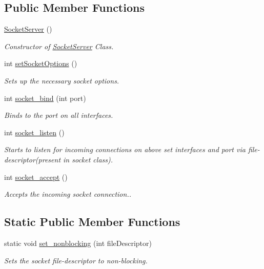 \subsection*{Public Member Functions}
\begin{DoxyCompactItemize}
\item 
\hyperlink{classSocketServer_a262ba93dc8ad71b260fb75124b3453ee}{Socket\+Server} ()\hypertarget{classSocketServer_a262ba93dc8ad71b260fb75124b3453ee}{}\label{classSocketServer_a262ba93dc8ad71b260fb75124b3453ee}

\begin{DoxyCompactList}\small\item\em Constructor of \hyperlink{classSocketServer}{Socket\+Server} Class. \end{DoxyCompactList}\item 
int \hyperlink{classSocketServer_a50b619d415d32f52771b663b3036940c}{set\+Socket\+Options} ()
\begin{DoxyCompactList}\small\item\em Sets up the necessary socket options. \end{DoxyCompactList}\item 
int \hyperlink{classSocketServer_aaa25d38578f271ab252bf9f5ecafd2e4}{socket\+\_\+bind} (int port)
\begin{DoxyCompactList}\small\item\em Binds to the port on all interfaces. \end{DoxyCompactList}\item 
int \hyperlink{classSocketServer_af49cec86f9f7c45fbeca8b94c37ec0a1}{socket\+\_\+listen} ()
\begin{DoxyCompactList}\small\item\em Starts to listen for incoming connections on above set interfaces and port via file-\/descriptor(present in socket class). \end{DoxyCompactList}\item 
int \hyperlink{classSocketServer_add005b4dc2e06b847566952e52029585}{socket\+\_\+accept} ()
\begin{DoxyCompactList}\small\item\em Accepts the incoming socket connection.. \end{DoxyCompactList}\end{DoxyCompactItemize}
\subsection*{Static Public Member Functions}
\begin{DoxyCompactItemize}
\item 
static void \hyperlink{classSocketServer_a7e2e444c9cb9a1d146fe33536eee5b2e}{set\+\_\+nonblocking} (int file\+Descriptor)
\begin{DoxyCompactList}\small\item\em Sets the socket file-\/descriptor to non-\/blocking. \end{DoxyCompactList}\end{DoxyCompactItemize}


